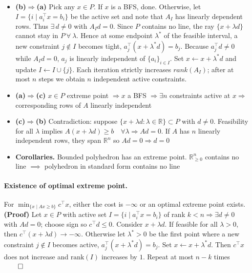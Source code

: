 \documentclass{article}
\begin{document}
\begin{itemize}
\item \textbf{(b)$\Rightarrow$(a)} 
Pick any $x\in P$. If $x$ is a BFS, done.  
Otherwise, let $I=\{i\mid a_i^\top x=b_i\}$ be the active set and note that $A_I$ has linearly dependent rows. Thus $\exists\, d\neq 0$ with $A_I d = 0$. 
Since $P$ contains no line, the ray $\{x+\lambda d\}$ cannot stay in $P\ \forall\ \lambda$.  
Hence at some endpoint $\lambda^*$ of the feasible interval, a new constraint $j\notin I$ becomes tight, $a_j^\top(x+\lambda^* d)=b_j$. 
Because $a_j^\top d\neq 0$ while $A_I d=0$, $a_j$ is linearly independent of $\{a_i\}_{i\in I}$.  
Set $x\leftarrow x+\lambda^* d$ and update $I\leftarrow I\cup\{j\}$.  
Each iteration strictly increases $rank(A_I)$; after at most $n$ steps we obtain $n$ independent active constraints. 

\item \textbf{(a)$\Rightarrow$(c)} 
$x\in P$ extreme point $\Rightarrow x$ a BFS $\Rightarrow \exists n$ constraints active at $x \Rightarrow$ corresponding rows of $A$ linearly independent

\item \textbf{(c)$\Rightarrow$(b)} 
Contradiction: suppose $\{x+\lambda d : \lambda\in\mathbb R\} \subset P$ with $d\neq 0$.  
Feasibility for all $\lambda$ implies $A(x+\lambda d)\ge b \quad\forall\lambda \Longrightarrow Ad = 0$. 
If $A$ has $n$ linearly independent rows, they span $\mathbb R^n$ so $Ad=0 \Rightarrow d=0$

\item \textbf{Corollaries.}
Bounded polyhedron has an extreme point. 
$\mathbb R_{\geq0}^n$ contains no line $\implies$ polyhedron in standard form contains no line
\end{itemize}




\paragraph{Existence of optimal extreme point.}
For $\min_{\{x\mid Ax\ge b\}}c^\top x$, either the cost is $-\infty$ or an optimal extreme point exists.
\textbf{(Proof)}
Let $x\in P$ with active set $I=\{i\mid a_i^\top x=b_i\}$ of rank $k<n \Longrightarrow \exists d\neq 0$ with $Ad=0$; choose sign so $c^\top d\le 0$.
Consider $x+\lambda d$. If feasible for all $\lambda>0$, then $c^\top(x+\lambda d)\to -\infty$.  
Otherwise let $\lambda^*>0$ be the first point where a new constraint $j\notin I$ becomes active, $a_j^\top(x+\lambda^* d)=b_j$.
Set $x\leftarrow x+\lambda^* d$.  
Then $c^\top x$ does not increase and $\text{rank}(I)$ increases by $1$.
Repeat at most $n-k$ times $\qed$
\end{document}
